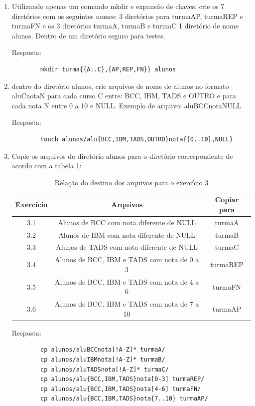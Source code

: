 \documentclass[oneside, 11 pt]{article}
\begin{document}
	\begin{enumerate}
		\item Utilizando apenas um comando mkdir e expansão de chaves, crie os 7 diretórios com os seguintes nomes: 3 diretórios para turmaAP, turmaREP e turmaFN e os 3 diretórios turmaA, turmaB e turmaC 1 diretório de nome alunos. Dentro de um diretório seguro para testes.
		
		Resposta:
		\begin{lstlisting}
		mkdir turma{{A..C},{AP,REP,FN}} alunos
		\end{lstlisting}
		\item dentro do diretório alunos, crie arquivos de nome de alunos no formato aluCnotaN para cada curso C entre: BCC, IBM, TADS e OUTRO e para cada nota N entre 0 a 10 e NULL. Exemplo de arquivo: aluBCCnotaNULL
		
		Resposta:
		\begin{lstlisting}
		touch alunos/alu{BCC,IBM,TADS,OUTRO}nota{{0..10},NULL}
		\end{lstlisting}
		\item Copie os arquivos do diretório alunos para o diretório correspondente de acordo com a tabela \ref{table:4}:
		
		\begin{table}[!ht]
			\centering
			\begin{tabular}{ | c | c | c | } 
				\hline
				\bfseries Exercício & \bfseries Arquivos & \bfseries Copiar para \\
				\hline
				3.1 & Alunos de BCC com nota diferente de NULL & turmaA \\
				\hline
				3.2 & Alunos de IBM com nota diferente de NULL & turmaB \\
				\hline
				3.3 & Alunos de TADS com nota diferente de NULL & turmaC \\
				\hline
				3.4 & Alunos de BCC, IBM e TADS com nota de 0 a 3 & turmaREP \\
				\hline
				3.5 & Alunos de BCC, IBM e TADS com nota de 4 a 6 & turmaFN \\
				\hline
				3.6 & Alunos de BCC, IBM e TADS com nota de 7 a 10 & turmaAP \\
				\hline
			\end{tabular}
			\caption{Relação do destino dos arquivos para o exercício 3}
			\label{table:4}
		\end{table}
		Resposta:
		\begin{lstlisting}
		cp alunos/aluBCCnota[!A-Z]* turmaA/
		cp alunos/aluIBMnota[!A-Z]* turmaB/
		cp alunos/aluTADSnota[!A-Z]* turmaC/
		cp alunos/alu{BCC,IBM,TADS}nota[0-3] turmaREP/
		cp alunos/alu{BCC,IBM,TADS}nota[4-6] turmaFN/
		cp alunos/alu{BCC,IBM,TADS}nota{7..10} turmaAP/
		\end{lstlisting}
	\end{enumerate}
	
\end{document}
